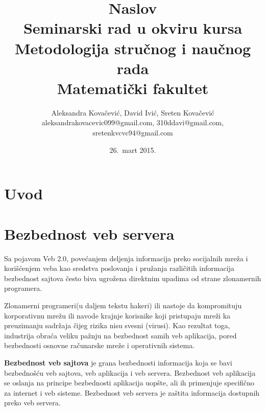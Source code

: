 \documentclass[a4paper]{article}
\begin{document}
\title{Naslov\\ \small{Seminarski rad u okviru kursa\\Metodologija stručnog i naučnog rada\\ Matematički fakultet}}

\author{Aleksandra Kovačević, David Ivić, Sreten Kovačević\\ aleksandrakovacevic099@gmail.com, 310ddavi@gmail.com,\\ sretenkvcvc94@gmail.com}
\date{26.~mart 2015.}
\maketitle

\abstract{
}

\tableofcontents

\newpage

\section{Uvod}
\section{Bezbednost veb servera}


Sa pojavom Veb 2.0, pove\'{c}anjem deljenja informacija preko socijalnih mre\v{z}a i kori\v{s}\'{c}enjem veba kao sredstva poslovanja i pru\v{z}anja razli\v{c}itih informacija bezbednost sajtova \v{c}esto biva ugro\v{z}ena direktnim upadima od strane zlonamernih programera.

Zlonamerni programeri(u daljem tekstu hakeri) ili nastoje da kompromituju korporativnu mre\v{z}u ili navode krajnje korisnike koji pristupaju mre\v{z}i ka preuzimanju sadr\v{z}aja \v{c}ijeg rizika nisu svesni (virusi). Kao rezultat toga, industrija obra\'{c}a veliku pa\v{z}nju na bezbednost samih veb aplikacija, pored bezbednosti osnovne ra\v{c}unarske mre\v{z}e i operativnih sistema.

\textbf{Bezbednost veb sajtova} je grana bezbednosti informacija koja se bavi bezbedno\v{s}\'{c}u veb sajtova, veb aplikacija i veb servera. Bezbednost veb aplikacija se oslanja na principe bezbednosti aplikacija uop\v{s}te, ali ih primenjuje specifi\v{c}no za internet i veb sisteme.
Bezbednost veb servera je za\v{s}tita informacija dostupnih preko veb servera.
\end{document}
